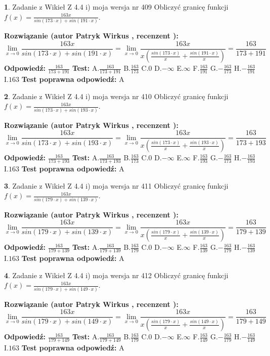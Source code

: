 \documentclass[12pt, a4paper]{article}
\theoremstyle{definition} %
\newtheorem{zad}{}
\newcommand{\zadStart}[1]{\begin{zad}#1\newline}
\newcommand{\zadStop}{\end{zad}}
\newcommand{\rozwStart}[2]{\noindent \textbf{Rozwiązanie (autor #1 , recenzent #2): }\newline}
\newcommand{\rozwStop}{\newline}
\newcommand{\odpStart}{\noindent \textbf{Odpowiedź:}\newline}
\newcommand{\odpStop}{\newline}
\newcommand{\testStart}{\noindent \textbf{Test:}\newline}
\newcommand{\testStop}{\newline}
\newcommand{\kluczStart}{\noindent \textbf{Test poprawna odpowiedź:}\newline}
\newcommand{\kluczStop}{\newline}
\begin{document}
\zadStart{Zadanie z Wikieł Z 4.4 i) moja wersja nr 409}
Obliczyć granicę funkcji $f(x)=\frac{163x}{sin(173\cdot x) +sin(191\cdot x)}$.
\zadStop
\rozwStart{Patryk Wirkus}{}
$$\lim\limits_{x\to 0}\frac{163x}{sin(173\cdot x) +sin(191\cdot x)}=\lim\limits_{x\to 0}\frac{163x}{x(\frac{sin(173\cdot x)}{x}+\frac{sin(191\cdot x)}{x})}=\frac{163}{173+191}$$
\rozwStop
\odpStart
$\frac{163}{173+191}$
\odpStop
\testStart
A.$\frac{163}{173+191}$
B.$\frac{163}{173}$
C.$0$
D.$-\infty$
E.$\infty$
F.$\frac{163}{191}$
G.$-\frac{163}{173}$
H.$-\frac{163}{191}$
I.$163$
\testStop
\kluczStart
A
\kluczStop



\zadStart{Zadanie z Wikieł Z 4.4 i) moja wersja nr 410}
Obliczyć granicę funkcji $f(x)=\frac{163x}{sin(173\cdot x) +sin(193\cdot x)}$.
\zadStop
\rozwStart{Patryk Wirkus}{}
$$\lim\limits_{x\to 0}\frac{163x}{sin(173\cdot x) +sin(193\cdot x)}=\lim\limits_{x\to 0}\frac{163x}{x(\frac{sin(173\cdot x)}{x}+\frac{sin(193\cdot x)}{x})}=\frac{163}{173+193}$$
\rozwStop
\odpStart
$\frac{163}{173+193}$
\odpStop
\testStart
A.$\frac{163}{173+193}$
B.$\frac{163}{173}$
C.$0$
D.$-\infty$
E.$\infty$
F.$\frac{163}{193}$
G.$-\frac{163}{173}$
H.$-\frac{163}{193}$
I.$163$
\testStop
\kluczStart
A
\kluczStop



\zadStart{Zadanie z Wikieł Z 4.4 i) moja wersja nr 411}
Obliczyć granicę funkcji $f(x)=\frac{163x}{sin(179\cdot x) +sin(139\cdot x)}$.
\zadStop
\rozwStart{Patryk Wirkus}{}
$$\lim\limits_{x\to 0}\frac{163x}{sin(179\cdot x) +sin(139\cdot x)}=\lim\limits_{x\to 0}\frac{163x}{x(\frac{sin(179\cdot x)}{x}+\frac{sin(139\cdot x)}{x})}=\frac{163}{179+139}$$
\rozwStop
\odpStart
$\frac{163}{179+139}$
\odpStop
\testStart
A.$\frac{163}{179+139}$
B.$\frac{163}{179}$
C.$0$
D.$-\infty$
E.$\infty$
F.$\frac{163}{139}$
G.$-\frac{163}{179}$
H.$-\frac{163}{139}$
I.$163$
\testStop
\kluczStart
A
\kluczStop



\zadStart{Zadanie z Wikieł Z 4.4 i) moja wersja nr 412}
Obliczyć granicę funkcji $f(x)=\frac{163x}{sin(179\cdot x) +sin(149\cdot x)}$.
\zadStop
\rozwStart{Patryk Wirkus}{}
$$\lim\limits_{x\to 0}\frac{163x}{sin(179\cdot x) +sin(149\cdot x)}=\lim\limits_{x\to 0}\frac{163x}{x(\frac{sin(179\cdot x)}{x}+\frac{sin(149\cdot x)}{x})}=\frac{163}{179+149}$$
\rozwStop
\odpStart
$\frac{163}{179+149}$
\odpStop
\testStart
A.$\frac{163}{179+149}$
B.$\frac{163}{179}$
C.$0$
D.$-\infty$
E.$\infty$
F.$\frac{163}{149}$
G.$-\frac{163}{179}$
H.$-\frac{163}{149}$
I.$163$
\testStop
\kluczStart
A
\kluczStop
\end{document}
